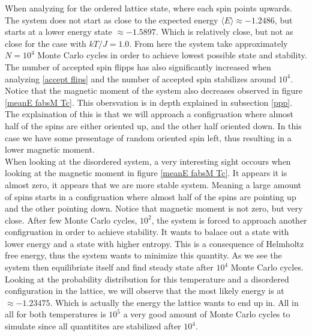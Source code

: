 \documentclass[a4paper, 10pt]{article}
\begin{document}
When analyzing for the ordered lattice state, where each spin points upwards.
The system does not start as close to the expected energy $\langle E \rangle \approx -1.2486$,
but starts at a lower energy state $\approx -1.5897$. Which is relatively close, but not as close for the case with $kT/J = 1.0$.
From here the system take approximately
$N = 10^{4}$ Monte Carlo cycles in order to achieve lowest possible state and stability. The number of accepted spin flipps has
also significantly increased when analyzing \eqref{accept flips} and the number of
accepted spin stabilizes around $10^{4}$.
\vspace{3mm}
\\
Notice that the magnetic moment of the system
also decreases observed in figure \eqref{meanE fabsM Tc}. This obersvation is in depth
explained in subsection \eqref{ppp}. The explaination of this is that we will approach a
configruation where almost half of the spins are either oriented up,
and the other half oriented down. In this case we have some presentage of random oriented spin left, thus resulting in a lower
magnetic moment.
\vspace{3mm}
\\
When looking at the disordered system, a very interesting sight occours when looking
at the magnetic moment in figure \eqref{meanE fabsM Tc}. It appears it is almost zero,
it appears that we are more stable system. Meaning a large amount of spins starts in a configruation
where almost half of the spins are pointing up and the other pointing down. Notice that magnetic moment is not
zero, but very close. After few Monte Carlo cycles, $10^{2}$, the system is forced to approach another configruation in order
to achieve stability. It wants to balace out a
state with lower energy and a state with higher entropy.  This is a consequence
of Helmholtz free energy, thus the system wants to minimize this quantity. As we see the system then equilibriate itself and find
steady state after $10^{4}$ Monte Carlo cycles. Looking at the probability
distribution for this temperature and a disordered configuration in the lattice, we will observe
that the most likely energy is at $\approx -1.23475$. Which is actually the energy the lattice wants to end up in.
All in all for both temperatures is $10^{5}$ a very good amount of Monte Carlo cycles to
simulate since all quantitites are stabilized after $10^{4}$.
\end{document}
